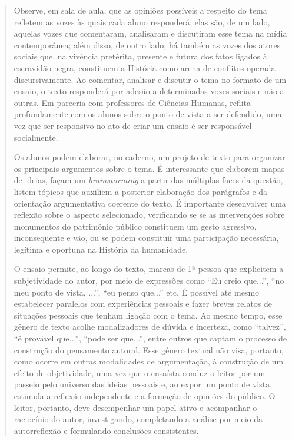 \documentclass[11pt]{extarticle}
\begin{document}
\begin{enumerate}
\begin{quote}
Observe, em sala de aula, que as opiniões possíveis a respeito do tema
refletem as vozes às quais cada aluno responderá: elas são, de um lado,
aquelas vozes que comentaram, analisaram e discutiram esse tema na mídia
contemporânea; além disso, de outro lado, há também as vozes dos atores
sociais que, na vivência pretérita, presente e futura dos fatos ligados
à escravidão negra, constituem a História como arena de conflitos
operada discursivamente. Ao comentar, analisar e discutir o tema no
formato de um ensaio, o texto responderá por adesão a determinadas vozes
sociais e não a outras. Em parceria com professores de Ciências Humanas,
reflita profundamente com os alunos sobre o ponto de vista a ser
defendido, uma vez que ser responsivo no ato de criar um ensaio é ser
responsável socialmente.

Os alunos podem elaborar, no caderno, um projeto de texto para organizar
os principais argumentos sobre o tema. É interessante que elaborem mapas
de ideias, façam um \emph{brainstorming} a partir das múltiplas faces da
questão, listem tópicos que auxiliem a posterior elaboração dos
parágrafos e da orientação argumentativa coerente do texto. É importante
desenvolver uma reflexão sobre o aspecto selecionado, verificando se se
as intervenções sobre monumentos do patrimônio público constituem um
gesto agressivo, inconsequente e vão, ou se podem constituir uma
participação necessária, legítima e oportuna na História da humanidade.

O ensaio permite, ao longo do texto, marcas de 1ª pessoa que explicitem
a subjetividade do autor, por meio de expressões como ``Eu creio
que...'', ``no meu ponto de vista, ...'', ``eu penso que...'' etc. É
possível até mesmo estabelecer paralelos com experiências pessoais e
fazer breves relatos de situações pessoais que tenham ligação com o
tema. Ao mesmo tempo, esse gênero de texto acolhe modalizadores de
dúvida e incerteza, como ``talvez'', ``é provável que...'', ``pode ser
que...'', entre outros que captam o processo de construção do pensamento
autoral. Esse gênero textual não visa, portanto, como ocorre em outras
modalidades de argumentação, à construção de um efeito de objetividade,
uma vez que o ensaísta conduz o leitor por um passeio pelo universo das
ideias pessoais e, ao expor um ponto de vista, estimula a reflexão
independente e a formação de opiniões do público. O leitor, portanto,
deve desempenhar um papel ativo e acompanhar o raciocínio do autor,
investigando, completando a análise por meio da autorreflexão e
formulando conclusões consistentes.


\end{quote}
\end{enumerate}
\end{document}

